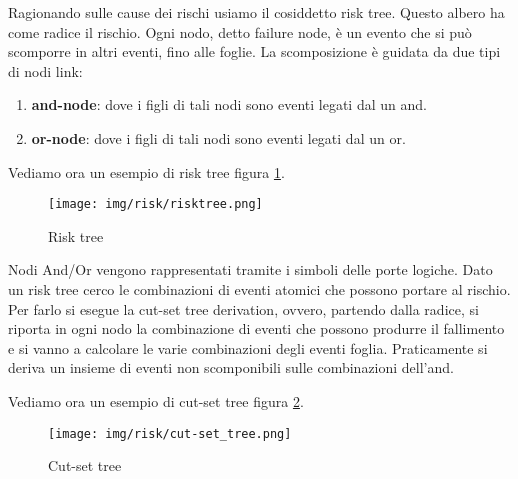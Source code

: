 Ragionando sulle cause dei rischi usiamo il cosiddetto risk tree. Questo albero
ha come radice il rischio. Ogni nodo, detto failure node, è un evento che si può
scomporre in altri eventi, fino alle foglie. La scomposizione è guidata da due
tipi di nodi link:
\begin{enumerate}
    \item \textbf{and-node}: dove i figli di tali nodi sono eventi legati dal un and.
    \item \textbf{or-node}: dove i figli di tali nodi sono eventi legati dal un or.
\end{enumerate}
\begin{esempio}
    Vediamo ora un esempio di risk tree figura \ref{fig:risk-tree}.
    \begin{figure}[!ht]
        \centering
        \texttt{[image: img/risk/risktree.png]}
        \caption{Risk tree}
        \label{fig:risk-tree}
    \end{figure}
\end{esempio}
Nodi And/Or vengono rappresentati tramite i simboli delle porte logiche. Dato un
risk tree cerco le combinazioni di eventi atomici che possono portare al rischio.
Per farlo si esegue la cut-set tree derivation, ovvero, partendo dalla radice, si
riporta in ogni nodo la combinazione di eventi che possono produrre il fallimento
e si vanno a calcolare le varie combinazioni degli eventi foglia. Praticamente si
deriva un insieme di eventi non scomponibili sulle combinazioni dell'and.
\begin{esempio}
    Vediamo ora un esempio di cut-set tree figura \ref{fig:cut-set-tree}.
    \begin{figure}[!ht]
        \centering
        \texttt{[image: img/risk/cut-set\_tree.png]}
        \caption{Cut-set tree}
        \label{fig:cut-set-tree}
    \end{figure}
\end{esempio}
